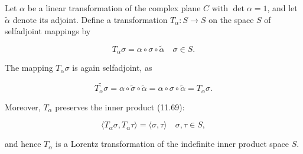Let $\alpha$ be a linear transformation of the complex plane $C$ with $\det \alpha = 1$, and let $\tilde{\alpha}$ denote its adjoint. Define a transformation $T_{\alpha}: S \to S$ on the space $S$ of selfadjoint mappings by

$$T_{\alpha} \sigma = \alpha \circ \sigma \circ \tilde{\alpha} \quad \sigma \in S.$$

The mapping $T_{\alpha} \sigma$ is again selfadjoint, as

$$\widetilde{T_{\alpha} \sigma} = \alpha \circ \tilde{\sigma} \circ \tilde{\alpha} = \alpha \circ \sigma \circ \tilde{\alpha} = T_{\alpha} \sigma.$$

Moreover, $T_{\alpha}$ preserves the inner product (11.69):

$$\langle T_{\alpha} \sigma, T_{\alpha} \tau \rangle = \langle \sigma, \tau \rangle \quad \sigma, \tau \in S,$$

and hence $T_{\alpha}$ is a Lorentz transformation of the indefinite inner product space $S$.
